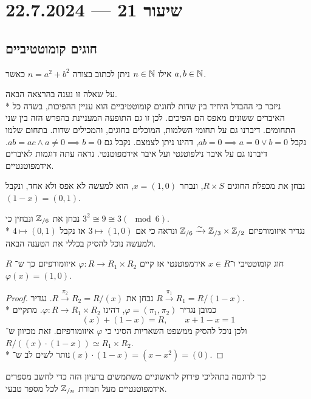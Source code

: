 \section{שיעור 21 --- 22.7.2024}
\subsection{חוגים קומוטטיביים}
\begin{exercise}
	אילו $n \in \mathbb{N}$ ניתן לכתוב בצורה $n = a^2 + b^2$ כאשר $a, b \in \mathbb{N}$.
\end{exercise}
על שאלה זו נענה בהרצאה הבאה. \\*
ניזכר כי ההבדל היחיד בין שדות לחוגים קומוטטיביים הוא עניין ההפיכות, בשדה כל האיברים ששונים מאפס הם הפיכים.
לכן זו גם התופעה המעניינת בהפרש הזה בין שני התחומים.
דיברנו גם על תחומי השלמות, המוכלים בחוגים, והמכילים שדות.
בתחום שלמו נקבל $a b = 0 \implies a = 0 \lor b = 0$, דהינו ניתן לצמצם.
נקבל גם $a b = ac \land a \ne 0 \implies b = 0$.
דיברנו גם על איבר נילפוטנטי ועל איבר אידמפוטנטי.
נראה עתה דוגמות לאיברים אידמפוטנטיים.
\begin{example}
	נבחן את מכפלת החוגים $R \times S$, ונבחר $x = (1, 0)$, הוא למעשה לא אפס ולא אחד, ונקבל $(1 - x) = (0, 1)$.
\end{example}
\begin{example}
	נבחן את $\mathbb{Z}_{/6}$ ונבחין כי $3^2 \cong 9 \cong 3 (\mod 6)$. \\*
	נגדיר איזומורפיזם $\mathbb{Z}_{/6} \xrightarrow{\sim} \mathbb{Z}_{/3} \times \mathbb{Z}_{/2}$ ונראה כי אם $3 \mapsto (1, 0)$ אז נקבל $4 \mapsto (0, 1)$ ולמעשה נוכל להסיק בכללי את הטענה הבאה.
\end{example}
\begin{proposition}
	$R$ חוג קומוטטיבי ו־$x \in R$ אידמפוטנטי אז קיים $\varphi : R \to R_1 \times R_2$ איזומורפיזם כך ש־$\varphi(x) = (1, 0)$.
\end{proposition}
\begin{proof}
	נבחן את $R \xrightarrow{\pi_2} R_2 = R / (x)$. נגדיר $R \xrightarrow{\pi_1} R_1 = R / (1 - x)$. \\*
	כמובן נגדיר $\varphi = (\pi_1, \pi_2)$, דהינו $\varphi : R \to R_1 \times R_2$. מתקיים
	\[
		(x) + (1 - x) = R,
		\qquad
		x + 1 - x = 1
	\]
	ולכן נוכל להסיק ממשפט השאריות הסיני כי $\varphi$ איזומורפיזם.
	זאת מכיוון ש־$R / ((x) \cdot (1 - x)) \simeq R_1 \times R_2$. \\*
	נותר לשים לב ש־$(x) \cdot (1 - x) = (x - x^2) = (0)$.
\end{proof}
כך לדוגמה בתהליכי פירוק לראשוניים משתמשים ברעיון הזה כדי לחשב מספרים אידמפוטנטיים מעל חבורת $\mathbb{Z}_{/n}$ לכל מספר טבעי.
